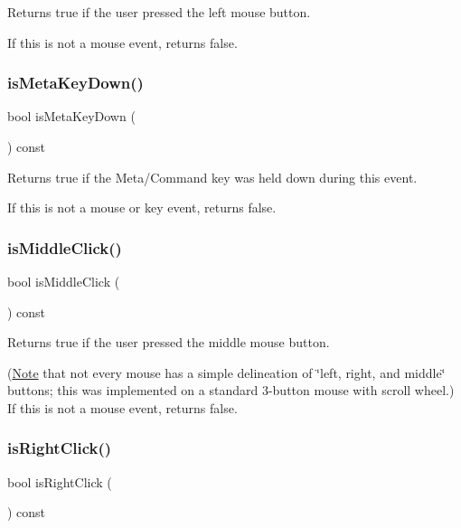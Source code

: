 Returns true if the user pressed the left mouse button. 

If this is not a mouse event, returns false. \mbox{\label{classGEvent_a37aa61a279efea6cb36cb5e6d8ada04c}} 
\subsubsection{\texorpdfstring{is\+Meta\+Key\+Down()}{isMetaKeyDown()}}
{\footnotesize\ttfamily bool is\+Meta\+Key\+Down (\begin{DoxyParamCaption}{ }\end{DoxyParamCaption}) const\hspace{0.3cm}{\ttfamily [virtual]}}



Returns {\ttfamily true} if the Meta/\+Command key was held down during this event. 

If this is not a mouse or key event, returns false. \mbox{\label{classGEvent_a92daecef1639c08c9565df591d261026}} 
\subsubsection{\texorpdfstring{is\+Middle\+Click()}{isMiddleClick()}}
{\footnotesize\ttfamily bool is\+Middle\+Click (\begin{DoxyParamCaption}{ }\end{DoxyParamCaption}) const\hspace{0.3cm}{\ttfamily [virtual]}}



Returns true if the user pressed the middle mouse button. 

(\mbox{\hyperlink{classNote}{Note}} that not every mouse has a simple delineation of \char`\"{}left, right,
and middle\char`\"{} buttons; this was implemented on a standard 3-\/button mouse with scroll wheel.) If this is not a mouse event, returns false. \mbox{\label{classGEvent_abf4c07eef83e15984a352af91c927d3d}} 
\subsubsection{\texorpdfstring{is\+Right\+Click()}{isRightClick()}}
{\footnotesize\ttfamily bool is\+Right\+Click (\begin{DoxyParamCaption}{ }\end{DoxyParamCaption}) const\hspace{0.3cm}{\ttfamily [virtual]}}



